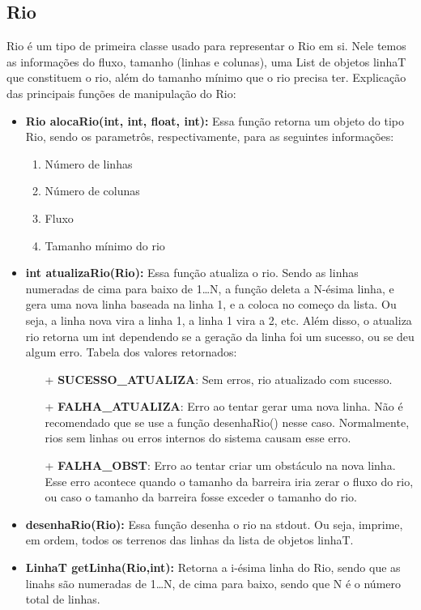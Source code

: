 \documentclass[11pt]{article}
\begin{document}
\subsection{Rio}

Rio é um tipo de primeira classe usado para representar o Rio em si. Nele temos as informações do fluxo, tamanho (linhas e colunas), uma List de objetos linhaT que constituem o rio, além do tamanho mínimo que o rio precisa ter.
Explicação das principais funções de manipulação do Rio:

\begin{itemize}

	\item \textbf{Rio alocaRio({\color{red}int}, {\color{red}int}, {\color{red}f\mbox{}loat}, {\color{red}int}):} Essa função retorna um objeto do tipo Rio, sendo os parametrôs, respectivamente, para as seguintes informações:
	\begin{enumerate}
		\item Número de linhas
		\item Número de colunas
		\item Fluxo
		\item Tamanho mínimo do rio		
	\end{enumerate}
	
	\item \textbf{int atualizaRio({\color{red}Rio}):} Essa função atualiza o rio. Sendo as linhas numeradas de cima para baixo de 1\ldots N, a função deleta a N-ésima linha, e gera uma nova linha baseada na linha 1, e a coloca no começo da lista. Ou seja, a linha nova vira a linha 1, a linha 1 vira a 2, etc.	
	Além disso, o atualiza rio retorna um int dependendo se a geração da linha foi um sucesso, ou se deu algum erro. Tabela dos valores retornados:
	
	\begin{itemize}
	\item[+]\textbf{SUCESSO\_{}ATUALIZA}: Sem erros, rio atualizado com sucesso.
    \item[+]\textbf{FALHA\_{}ATUALIZA}: Erro ao tentar gerar uma nova linha. Não é recomendado que se use a função desenhaRio() nesse caso. Normalmente, rios sem linhas ou erros internos do sistema causam esse erro.
    \item[+]\textbf{FALHA\_{}OBST}: Erro ao tentar criar um obstáculo na nova linha. Esse erro acontece quando o tamanho da barreira iria zerar o fluxo
    do rio, ou caso o tamanho da barreira fosse exceder o tamanho do rio.
    	\end{itemize}
    
    \item\textbf{desenhaRio({\color{red}Rio}):} Essa função desenha o rio na stdout. Ou seja, imprime, em ordem, todos os terrenos das linhas da lista de objetos linhaT.
	
	\item\textbf{LinhaT getLinha({\color{red}Rio},{\color{red}int}):} Retorna a i-ésima linha do Rio, sendo que as linahs são numeradas de 1\ldots N, de cima para baixo, sendo que N é o número total de linhas.

		

\end{itemize}
\end{document}
